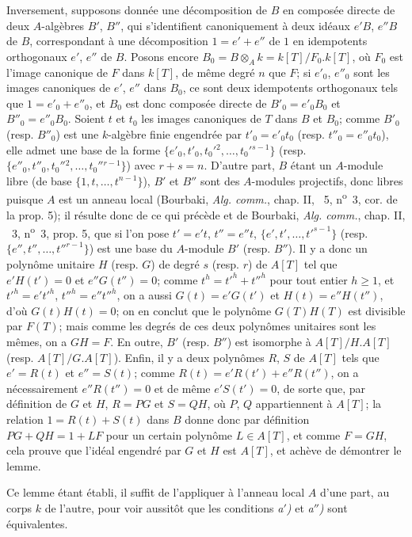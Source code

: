 Inversement, supposons donnée une décomposition de $B$ en composée directe de deux $A$-algèbres $B'$, $B''$, qui s'identifient canoniquement à deux idéaux $e'B$, $e''B$ de $B$, correspondant à une décomposition $1=e'+e''$ de $1$ en idempotents orthogonaux $e'$, $e''$ de $B$. Posons encore $B_0=B\otimes_A k=k[T]/F_0.k[T]$, où $F_0$ est l'image canonique de $F$ dans $k[T]$, de même degré $n$ que $F$; si $e'_0$, $e''_0$ sont les images canoniques de $e'$, $e''$ dans $B_0$, ce sont deux idempotents orthogonaux tels que $1=e'_0+e''_0$, et $B_0$ est donc composée directe de $B'_0=e'_0B_0$ et $B''_0=e''_0B_0$. Soient $t$ et $t_0$ les images canoniques de $T$ dans $B$ et $B_0$; comme $B'_0$ (resp. $B''_0$) est une $k$-algèbre finie engendrée par $t'_0=e'_0t_0$ (resp. $t''_0=e''_0t_0$), elle admet une base de la forme $\{e'_0,t'_0,t_0'{}^2,\ldots,t_0'{}^{s-1}\}$ (resp. $\{e''_0,t''_0,t_0''{}^2,\ldots,t_0''{}^{r-1}\}$) avec $r+s=n$. D'autre part, $B$ étant un $A$-module libre (de base $\{1,t,\ldots,t^{n-1}\}$), $B'$ et $B''$ sont des $A$-modules projectifs, donc libres puisque $A$ est un anneau local (Bourbaki, \emph{Alg. comm.}, chap. II, \textsection~5, n\textsuperscript{o}~3, cor. de la prop. 5); il résulte donc de ce qui précède et de Bourbaki, \emph{Alg. comm.}, chap. II, \textsection~3, n\textsuperscript{o}~3, prop. 5, que si l'on pose $t'=e't$, $t''=e''t$, $\{e',t',\ldots,t'^{s-1}\}$ (resp. $\{e'',t'',\ldots,t''^{r-1}\}$) est une base du $A$-module $B'$ (resp. $B''$). Il y a donc un polynôme unitaire $H$ (resp. $G$) de degré $s$ (resp. $r$) de $A[T]$ tel que $e'H(t')=0$ et $e''G(t'')=0$; comme $t^h=t'^h+t''^h$ pour tout entier $h\geq1$, et $t'^h=e't'^h$, $t''^h=e''t''^h$, on a aussi $G(t)=e'G(t')$ et $H(t)=e''H(t'')$, d'où $G(t)H(t)=0$; on en conclut que le polynôme $G(T)H(T)$ est divisible par $F(T)$; mais comme les degrés de ces deux polynômes unitaires sont les mêmes, on a $GH=F$. En outre, $B'$ (resp. $B''$) est isomorphe à $A[T]/H.A[T]$ (resp. $A[T]/G.A[T]$). Enfin, il y a deux polynômes $R$, $S$ de $A[T]$ tels que $e'=R(t)$ et $e''=S(t)$; comme $R(t)=e'R(t')+e''R(t'')$, on a nécessairement $e''R(t'')=0$ et de même $e'S(t')=0$, de sorte que, par définition de $G$ et $H$, $R=PG$ et $S=QH$, où $P$, $Q$ appartiennent à $A[T]$; la relation $1=R(t)+S(t)$ dans $B$ donne donc par définition $PG+QH=1+LF$ pour un certain polynôme $L\in A[T]$, et comme $F=GH$, cela prouve que l'idéal engendré par $G$ et $H$ est $A[T]$, et achève de démontrer le lemme.

Ce lemme étant établi, il suffit de l'appliquer à l'anneau local $A$ d'une part, au corps $k$ de l'autre, pour voir aussitôt que les conditions \emph{a$'$)} et \emph{a$''$)} sont équivalentes.

